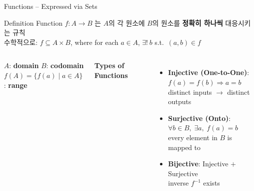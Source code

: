 \documentclass{beamer}
\begin{document}
\begin{frame}[t,shrink=5]{Functions -- Expressed via Sets}
    \small
    \vspace{0.05cm}
    \begin{block}{Definition}
        \footnotesize
        Function $f: A \to B$ 는 $A$의 각 원소에 $B$의 원소를 \textbf{정확히 하나씩} 대응시키는 규칙\\[3pt]
        수학적으로: $f \subseteq A \times B$, where for each $a \in A$, $\exists!\ b$ s.t.\ $(a, b) \in f$
    \end{block}

    \vspace{0.05cm}
    \begin{columns}[T]
        \footnotesize
        $A$: \textbf{domain} \quad $B$: \textbf{codomain}\\
        $f(A) = \{f(a) \mid a \in A\}$: \textbf{range}

        \vspace{0.1cm}
        \textbf{Types of Functions}
        \vspace{0.05cm}
        \scriptsize
        \begin{itemize}\setlength\itemsep{0.15em}
            \item \textbf{Injective (One-to-One)}:\\
                  $f(a) = f(b) \Rightarrow a = b$\\
                  distinct inputs $\to$ distinct outputs
            \item \textbf{Surjective (Onto)}:\\
                  $\forall b \in B,\; \exists a,\; f(a) = b$\\
                  every element in $B$ is mapped to
            \item \textbf{Bijective}: Injective $+$ Surjective\\
                  inverse $f^{-1}$ exists
        \end{itemize}

        \centering
\end{columns}
\end{frame}
\end{document}
